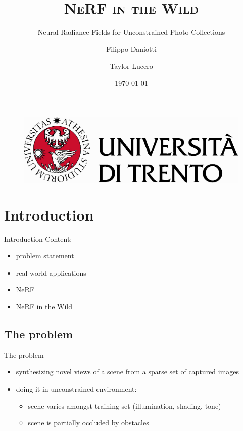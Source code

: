 \documentclass[aspectratio=1610,handout]{beamer}
\author[Daniotti \and Lucero]{Filippo Daniotti \and Taylor Lucero}
\title[NeRF-W]{\textsc{NeRF in the Wild}}
\subtitle{Neural Radiance Fields for Unconstrained Photo Collections}
\institute[DISI - UniTN]{Department of Information Engineering\\and Computer Science}
\date{\today}
\begin{document}
\begin{frame}
    \titlepage
    \begin{figure}[H]
        \begin{center}
            \includegraphics[width=0.4\linewidth]{marchio_unitrento_colore_it_202002.eps}
        \end{center}
    \end{figure}
\end{frame}


\begin{frame}
    \tableofcontents[sectionstyle=show,subsectionstyle=show,subsubsectionstyle=show/shaded/hide]
\end{frame}

\section{Introduction}
\begin{frame}{Introduction}
    Content:
    \begin{itemize}
        \item problem statement
        \item real world applications
        \item NeRF
        \item NeRF in the Wild
    \end{itemize}
\end{frame}

\subsection{The problem}
\begin{frame}{The problem}
    \begin{itemize}
        \item synthesizing novel views of a scene from a sparse set of captured images
        \item doing it in unconstrained environment:
        \begin{itemize}
            \item scene varies amongst training set (illumination, shading, tone)
            \item scene is partially occluded by obstacles
        \end{itemize}
    \end{itemize}
\end{frame}
\end{document}
